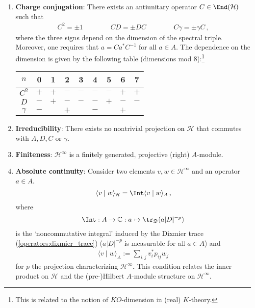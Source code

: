 \begin{remark}
\begin{enumerate}
            \item\textbf{Charge conjugation}: There exists an antiunitary operator $C\in\End(\mathcal{H})$ such that
            \begin{gather}
                C^2=\pm1\qquad\qquad CD=\pm DC\qquad\qquad C\gamma=\pm\gamma C\,,
            \end{gather}
            where the three signs depend on the dimension of the spectral triple. Moreover, one requires that $a=Ca^*C^{-1}$ for all $a\in A$. The dependence on the dimension is given by the following table (dimensions mod 8):\footnote{This is related to the notion of $K\!O$-dimension in (real) $K$-theory.}
            \begin{center}
                \begin{tabular}{|c|c|c|c|c|c|c|c|c|}
                    \hline
                    $n$&0&1&2&3&4&5&6&7\\
                    \hline
                    $C^2$&$+$&$+$&$-$&$-$&$-$&$-$&$+$&$+$\\
                    \hline
                    $D$&$-$&$+$&$-$&$-$&$-$&$+$&$-$&$-$\\
                    \hline
                    $\gamma$&$-$&&$+$&&$-$&&$+$&\\
                    \hline
                \end{tabular}
            \end{center}
            \item\textbf{Irreducibility}: There exists no nontrivial projection on $\mathcal{H}$ that commutes with $A,D,C$ or $\gamma$.
            \item\textbf{Finiteness}: $\mathcal{H}^\infty$ is a finitely generated, projective (right) $A$-module.
            \item\textbf{Absolute continuity}: Consider two elements $v,w\in\mathcal{H}^\infty$ and an operator $a\in A$.
                \begin{gather}
                    \langle v\mid w \rangle_{\mathcal{H}} = \Int\langle v\mid w \rangle_A\,,
                \end{gather}
                where
                \begin{gather}
                    \Int:A\rightarrow\mathbb{C}:a\mapsto\tr_{\mathfrak{D}}(a|D|^{-p})
                \end{gather}
                is the `noncommutative integral' induced by the Dixmier trace (\cref{operators:dixmier_trace}) ($a|D|^{-p}$ is measurable for all $a\in A$) and
                \begin{gather}
                    \langle v\mid w \rangle_A := \sum_{i,j} v^*_ip_{ij}w_j
                \end{gather}
                for $p$ the projection characterizing $\mathcal{H}^\infty$. This condition relates the inner product on $\mathcal{H}$ and the (pre-)Hilbert $A$-module structure on $\mathcal{H}^\infty$.
        \end{enumerate}
    \end{remark}

